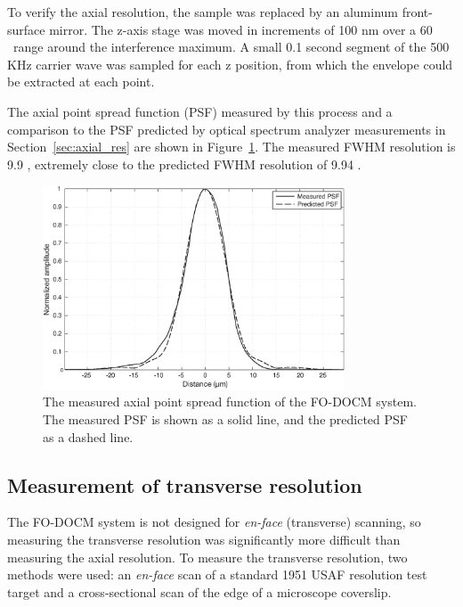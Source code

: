
To verify the axial resolution, the sample was replaced by an aluminum front-surface mirror. The z-axis stage was moved in increments of 100 nm over a 60 \micron~range around the interference maximum. A small 0.1 second segment of the 500 KHz carrier wave was sampled for each z position, from which the envelope could be extracted at each point.

The axial point spread function (PSF) measured by this process and a comparison to the PSF predicted by optical spectrum analyzer measurements in Section~\ref{sec:axial_res} are shown in Figure~\ref{fig:psf_comparison}. The measured FWHM resolution is 9.9 \micron, extremely close to the predicted FWHM resolution of 9.94 \micron.

\begin{figure}[h!]
\centering
\includegraphics[width=0.8\textwidth]{Images/Results/psf-aom2.eps}
\caption[The measured axial point spread function.]{The measured axial point spread function of the FO-DOCM system. The measured PSF is shown as a solid line, and the predicted PSF as a dashed line.\label{fig:psf_comparison}}
\end{figure}

\subsection{Measurement of transverse resolution}

The FO-DOCM system is not designed for {\em en-face} (transverse) scanning, so measuring the transverse resolution was significantly more difficult than measuring the axial resolution. To measure the transverse resolution, two methods were used: an {\em en-face} scan of a standard 1951 USAF resolution test target and a cross-sectional scan of the edge of a microscope coverslip.


